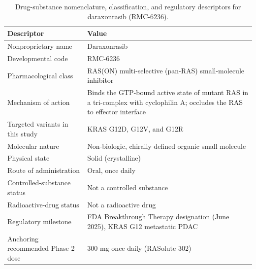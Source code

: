 \begin{table}[t]
\centering
\caption{Drug-substance nomenclature, classification, and regulatory descriptors
for daraxonrasib (RMC-6236).}
\label{tab:cmc-ds-nomenclature}
\begin{tabularx}{\textwidth}{L{4.6cm} Y}
\toprule
\textbf{Descriptor} & \textbf{Value} \\
\midrule
Nonproprietary name & Daraxonrasib \\
Developmental code & RMC-6236 \\
Pharmacological class & RAS(ON) multi-selective (pan-RAS) small-molecule inhibitor \\
Mechanism of action & Binds the GTP-bound active state of mutant RAS in a tri-complex with cyclophilin A; occludes the RAS to effector interface \\
Targeted variants in this study & KRAS G12D, G12V, and G12R \\
Molecular nature & Non-biologic, chirally defined organic small molecule \\
Physical state & Solid (crystalline) \\
Route of administration & Oral, once daily \\
Controlled-substance status & Not a controlled substance \\
Radioactive-drug status & Not a radioactive drug \\
Regulatory milestone & FDA Breakthrough Therapy designation (June 2025), KRAS G12 metastatic PDAC \\
Anchoring recommended Phase 2 dose & 300 mg once daily (RASolute 302) \\
\bottomrule
\end{tabularx}
\end{table}

